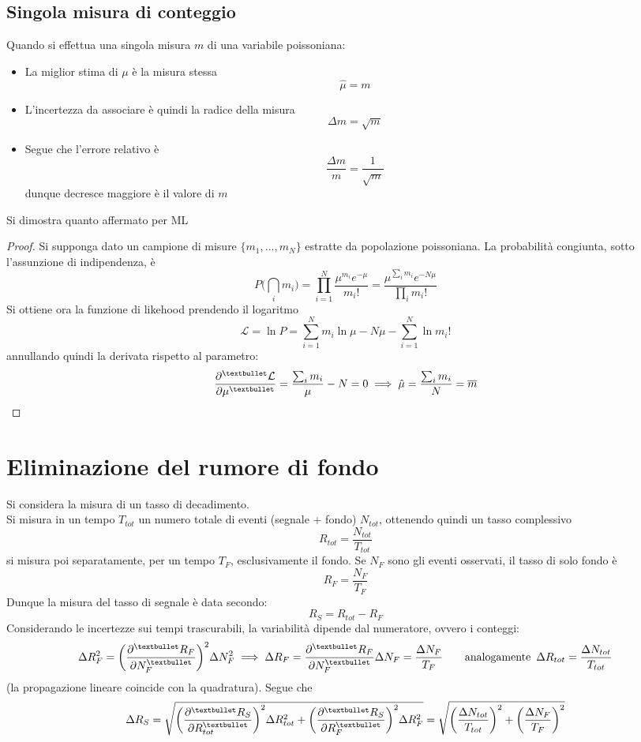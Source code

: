 \documentclass[10pt, oneside]{book}
\begin{document}
\subsection{Singola misura di conteggio}
Quando si effettua una singola misura $m$ di una variabile poissoniana:
\begin{itemize}
\item La miglior stima di $\mu$ è la misura stessa
\[\hat{\mu} = m\]
\item L'incertezza da associare è quindi la radice della misura
\[\Delta m = \sqrt{m}\]
\item Segue che l'errore relativo è
\[\frac{\Delta m}{m} = \frac{1}{\sqrt{m}}\]
dunque decresce maggiore è il valore di $m$
\end{itemize}
Si dimostra quanto affermato per ML
\begin{proof}
Si supponga dato un campione di misure $\{m_1, ..., m_N\}$ estratte da popolazione poissoniana. La probabilità congiunta, sotto l'assunzione di indipendenza, è
\[P\big(\bigcap_i m_i\big) = \prod\limits_{i=1}^N \frac{\mu^{m_i} e^{-\mu}}{m_i!} = \frac{\mu^{\sum_i m_i} e^{-N\mu}}{\prod_i m_i!}\]
Si ottiene ora la funzione di likehood prendendo il logaritmo
\[\mathcal{L} = \ln P = \sum\limits_{i=1}^{N} m_i \ln \mu - N \mu - \sum\limits_{i=1}^{N} \ln m_i!\]
annullando quindi la derivata rispetto al parametro:
\[\pdv[•]{\mathcal{L}}{\mu} = \frac{\sum_i m_i}{\mu} - N = 0 \implies \hat{\mu} = \frac{\sum_i m_i}{N} = \overline{m}\]
\end{proof}

\section{Eliminazione del rumore di fondo}
Si considera la misura di un tasso di decadimento.\\
Si misura in un tempo $T_{tot}$ un numero totale di eventi (segnale + fondo) $N_{tot}$, ottenendo quindi un tasso complessivo
\[R_{tot} = \frac{N_{tot}}{T_{tot}}\]
si misura poi separatamente, per un tempo $T_F$, esclusivamente il fondo. Se $N_F$ sono gli eventi osservati, il tasso di solo fondo è
\[R_F = \frac{N_F}{T_F}\]
Dunque la misura del tasso di segnale è data secondo:
\[R_S = R_{tot} - R_F\]
Considerando le incertezze sui tempi trascurabili, la variabilità dipende dal numeratore, ovvero i conteggi:
\[\Delta R_F^2 = \bigg(\pdv[•]{R_F}{N_F}\bigg)^2 \Delta N_F^2 \implies \Delta R_F = \pdv[•]{R_F}{N_F} \Delta N_F = \frac{\Delta N_F}{T_F} \qquad \textrm{analogamente } \, \Delta R_{tot} = \frac{\Delta N_{tot}}{T_{tot}}\]
(la propagazione lineare coincide con la quadratura). Segue che
\[\Delta R_S = \sqrt{\bigg(\pdv[•]{R_S}{R_{tot}}\bigg)^2 \Delta R_{tot}^2 + \bigg(\pdv[•]{R_S}{R_F}\bigg)^2 \Delta R_F^2} = \sqrt{\bigg(\frac{\Delta N_{tot}}{T_{tot}}\bigg)^{2} + \bigg(\frac{\Delta N_F}{T_F}\bigg)^{2}}\]
\end{document}
